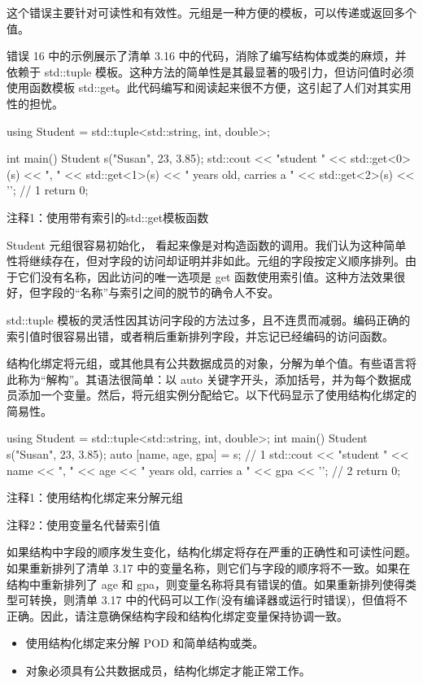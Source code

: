 这个错误主要针对可读性和有效性。元组是一种方便的模板，可以传递或返回多个值。


错误 16 中的示例展示了清单 3.16 中的代码，消除了编写结构体或类的麻烦，并依赖于 std::tuple 模板。这种方法的简单性是其最显著的吸引力，但访问值时必须使用函数模板 std::get。此代码编写和阅读起来很不方便，这引起了人们对其实用性的担忧。


\begin{cpp}
using Student = std::tuple<std::string, int, double>;

int main() {
  Student s("Susan", 23, 3.85);
  std::cout << "student " << std::get<0>(s) << ", " << std::get<1>(s) <<
        " years old, carries a " << std::get<2>(s) << '\n'; // 1
  return 0;
}
\end{cpp}

{\footnotesize
注释1：使用带有索引的std::get模板函数
}


Student 元组很容易初始化， 看起来像是对构造函数的调用。我们认为这种简单性将继续存在，但对字段的访问却证明并非如此。元组的字段按定义顺序排列。由于它们没有名称，因此访问的唯一选项是 get 函数使用索引值。这种方法效果很好，但字段的“名称”与索引之间的脱节的确令人不安。


std::tuple 模板的灵活性因其访问字段的方法过多，且不连贯而减弱。编码正确的索引值时很容易出错，或者稍后重新排列字段，并忘记已经编码的访问函数。

结构化绑定将元组，或其他具有公共数据成员的对象，分解为单个值。有些语言将此称为“解构”。其语法很简单：以 auto 关键字开头，添加括号，并为每个数据成员添加一个变量。然后，将元组实例分配给它。以下代码显示了使用结构化绑定的简易性。


\begin{cpp}
using Student = std::tuple<std::string, int, double>;
int main() {
  Student s("Susan", 23, 3.85);
  auto [name, age, gpa] = s; // 1
  std::cout << "student " << name << ", " << age <<
      " years old, carries a " << gpa << '\n'; // 2
  return 0;
}
\end{cpp}

{\footnotesize
注释1：使用结构化绑定来分解元组

注释2：使用变量名代替索引值
}

如果结构中字段的顺序发生变化，结构化绑定将存在严重的正确性和可读性问题。如果重新排列了清单 3.17 中的变量名称，则它们与字段的顺序将不一致。如果在结构中重新排列了 age 和 gpa，则变量名称将具有错误的值。如果重新排列使得类型可转换，则清单 3.17 中的代码可以工作(没有编译器或运行时错误)，但值将不正确。因此，请注意确保结构字段和结构化绑定变量保持协调一致。


\begin{itemize}
\item
使用结构化绑定来分解 POD 和简单结构或类。

\item
对象必须具有公共数据成员，结构化绑定才能正常工作。
\end{itemize}

